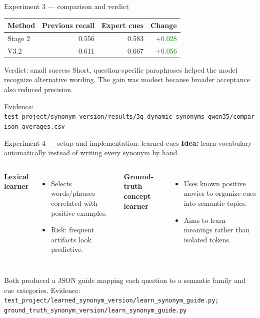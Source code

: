 \documentclass[aspectratio=169,10pt]{beamer}
\newcommand{\yes}[1]{\textcolor{green}{#1}}\newcommand{\no}[1]{\textcolor{red}{#1}}\newcommand{\key}[1]{\textcolor{yellow}{#1}}
\newcommand{\citecode}[1]{\vfill{\color{soft}\tiny Evidence: \texttt{#1}}}
\begin{document}
\begin{frame}{Experiment 3 --- comparison and verdict}
\centering
\begin{tabular}{lrrr}\toprule Method & Previous recall & Expert cues & Change\\\midrule
Stage 2 & 0.556 & 0.583 & \yes{+0.028}\\
V3.2 & 0.611 & 0.667 & \yes{+0.056}\\\bottomrule\end{tabular}
\vfill
\begin{block}{Verdict: small success}
Short, question-specific paraphrases helped the model recognize alternative wording. The gain was modest because broader acceptance also reduced precision.
\end{block}
\citecode{test\_project/synonym\_version/results/3q\_dynamic\_synonyms\_qwen35/comparison\_averages.csv}
\end{frame}

\begin{frame}{Experiment 4 --- setup and implementation: learned cues}
\textbf{Idea:} learn vocabulary automatically instead of writing every synonym by hand.
\begin{columns}[T]\textbf{Lexical learner}
\begin{itemize}\item Selects words/phrases correlated with positive examples.\item Risk: frequent artifacts look predictive.\end{itemize}
\textbf{Ground-truth concept learner}
\begin{itemize}\item Uses known positive movies to organize cues into semantic topics.\item Aims to learn meanings rather than isolated tokens.\end{itemize}\end{columns}
\vfill
Both produced a JSON guide mapping each question to a semantic family and cue categories.
\citecode{test\_project/learned\_synonym\_version/learn\_synonym\_guide.py; ground\_truth\_synonym\_version/learn\_synonym\_guide.py}
\end{frame}
\end{document}
